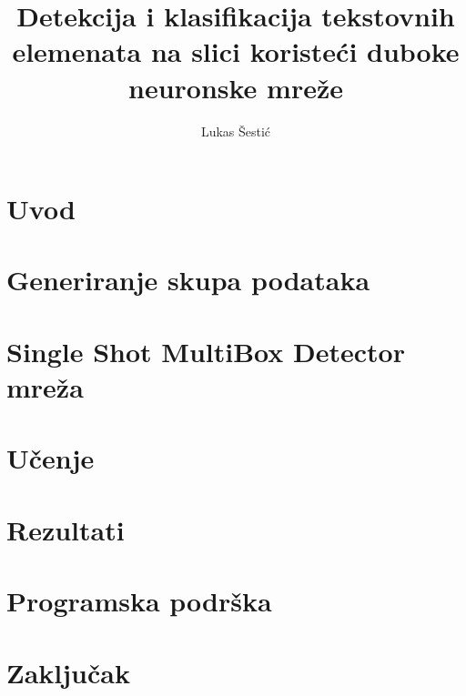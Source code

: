 \documentclass[utf8, zavrsni]{fer}
\begin{document}
\title{Detekcija i klasifikacija tekstovnih elemenata na slici koristeći duboke neuronske mreže}
\author{Lukas Šestić}
\maketitle

\izvornik


\tableofcontents

\chapter{Uvod}


\chapter{Generiranje skupa podataka}


\chapter{Single Shot MultiBox Detector mreža}


\chapter{Učenje}


\chapter{Rezultati}


\chapter{Programska podrška}


\chapter{Zaključak}




\end{document}
